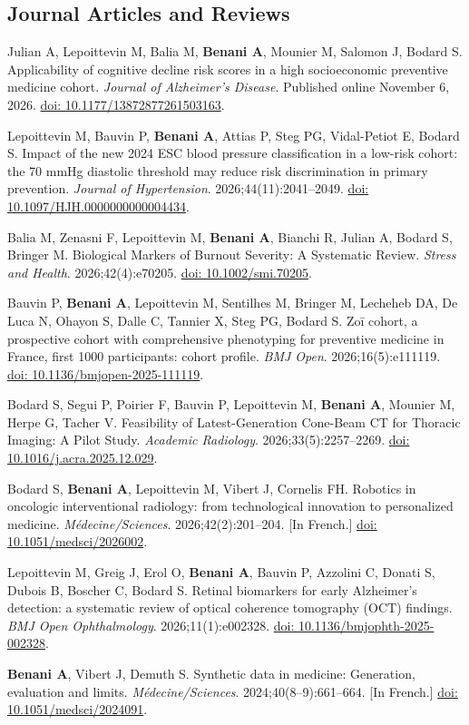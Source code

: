 \documentclass[10pt,letterpaper]{article}
\newcommand{\doi}[1]{\href{https://doi.org/#1}{doi: #1}}
\newcommand{\me}{\textbf{Benani A}}
\begin{document}
\subsection{Journal Articles and Reviews}
\begin{pubs}
\item Julian A, Lepoittevin M, Balia M, \me, Mounier M, Salomon J, Bodard S. Applicability of cognitive decline risk scores in a high socioeconomic preventive medicine cohort. \textit{Journal of Alzheimer's Disease}. Published online November 6, 2026. \doi{10.1177/13872877261503163}.
\item Lepoittevin M, Bauvin P, \me, Attias P, Steg PG, Vidal-Petiot E, Bodard S. Impact of the new 2024 ESC blood pressure classification in a low-risk cohort: the 70 mmHg diastolic threshold may reduce risk discrimination in primary prevention. \textit{Journal of Hypertension}. 2026;44(11):2041--2049. \doi{10.1097/HJH.0000000000004434}.
\item Balia M, Zenasni F, Lepoittevin M, \me, Bianchi R, Julian A, Bodard S, Bringer M. Biological Markers of Burnout Severity: A Systematic Review. \textit{Stress and Health}. 2026;42(4):e70205. \doi{10.1002/smi.70205}.
\item Bauvin P, \me, Lepoittevin M, Sentilhes M, Bringer M, Lecheheb DA, De Luca N, Ohayon S, Dalle C, Tannier X, Steg PG, Bodard S. Zoī cohort, a prospective cohort with comprehensive phenotyping for preventive medicine in France, first 1000 participants: cohort profile. \textit{BMJ Open}. 2026;16(5):e111119. \doi{10.1136/bmjopen-2025-111119}.
\item Bodard S, Segui P, Poirier F, Bauvin P, Lepoittevin M, \me, Mounier M, Herpe G, Tacher V. Feasibility of Latest-Generation Cone-Beam CT for Thoracic Imaging: A Pilot Study. \textit{Academic Radiology}. 2026;33(5):2257--2269. \doi{10.1016/j.acra.2025.12.029}.
\item Bodard S, \me, Lepoittevin M, Vibert J, Cornelis FH. Robotics in oncologic interventional radiology: from technological innovation to personalized medicine. \textit{Médecine/Sciences}. 2026;42(2):201--204. [In French.] \doi{10.1051/medsci/2026002}.
\item Lepoittevin M, Greig J, Erol O, \me, Bauvin P, Azzolini C, Donati S, Dubois B, Boscher C, Bodard S. Retinal biomarkers for early Alzheimer's detection: a systematic review of optical coherence tomography (OCT) findings. \textit{BMJ Open Ophthalmology}. 2026;11(1):e002328. \doi{10.1136/bmjophth-2025-002328}.
\item \me, Vibert J, Demuth S. Synthetic data in medicine: Generation, evaluation and limits. \textit{Médecine/Sciences}. 2024;40(8--9):661--664. [In French.] \doi{10.1051/medsci/2024091}.
\end{pubs}
\end{document}
